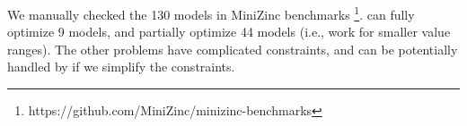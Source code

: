 We manually checked the 130 models in MiniZinc benchmarks \footnote{https://github.com/MiniZinc/minizinc-benchmarks}. \tool can fully optimize 9 models, and partially optimize 44 models (i.e., work for smaller value ranges). The other problems have complicated constraints, and can be potentially handled by \tool if we simplify the constraints.







